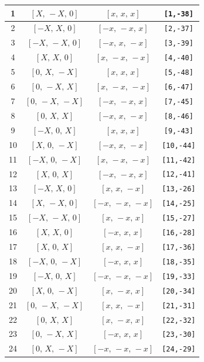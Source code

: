 \documentclass[fleqn,8pt]{jsarticle}
\begin{document}
\begin{longtable}{cccc}
1 & $\left[ X,\, - X,\, 0 \right]$ & $\left[ x,\, x,\, x \right]$ & {\tt [1,-38]} \\ \hline
2 & $\left[ - X,\, X,\, 0 \right]$ & $\left[ - x,\, - x,\, x \right]$ & {\tt [2,-37]} \\ \hline
3 & $\left[ - X,\, - X,\, 0 \right]$ & $\left[ - x,\, x,\, - x \right]$ & {\tt [3,-39]} \\ \hline
4 & $\left[ X,\, X,\, 0 \right]$ & $\left[ x,\, - x,\, - x \right]$ & {\tt [4,-40]} \\ \hline
5 & $\left[ 0,\, X,\, - X \right]$ & $\left[ x,\, x,\, x \right]$ & {\tt [5,-48]} \\ \hline
6 & $\left[ 0,\, - X,\, X \right]$ & $\left[ x,\, - x,\, - x \right]$ & {\tt [6,-47]} \\ \hline
7 & $\left[ 0,\, - X,\, - X \right]$ & $\left[ - x,\, - x,\, x \right]$ & {\tt [7,-45]} \\ \hline
8 & $\left[ 0,\, X,\, X \right]$ & $\left[ - x,\, x,\, - x \right]$ & {\tt [8,-46]} \\ \hline
9 & $\left[ - X,\, 0,\, X \right]$ & $\left[ x,\, x,\, x \right]$ & {\tt [9,-43]} \\ \hline
10 & $\left[ X,\, 0,\, - X \right]$ & $\left[ - x,\, x,\, - x \right]$ & {\tt [10,-44]} \\ \hline
11 & $\left[ - X,\, 0,\, - X \right]$ & $\left[ x,\, - x,\, - x \right]$ & {\tt [11,-42]} \\ \hline
12 & $\left[ X,\, 0,\, X \right]$ & $\left[ - x,\, - x,\, x \right]$ & {\tt [12,-41]} \\ \hline
13 & $\left[ - X,\, X,\, 0 \right]$ & $\left[ x,\, x,\, - x \right]$ & {\tt [13,-26]} \\ \hline
14 & $\left[ X,\, - X,\, 0 \right]$ & $\left[ - x,\, - x,\, - x \right]$ & {\tt [14,-25]} \\ \hline
15 & $\left[ - X,\, - X,\, 0 \right]$ & $\left[ x,\, - x,\, x \right]$ & {\tt [15,-27]} \\ \hline
16 & $\left[ X,\, X,\, 0 \right]$ & $\left[ - x,\, x,\, x \right]$ & {\tt [16,-28]} \\ \hline
17 & $\left[ X,\, 0,\, X \right]$ & $\left[ x,\, x,\, - x \right]$ & {\tt [17,-36]} \\ \hline
18 & $\left[ - X,\, 0,\, - X \right]$ & $\left[ - x,\, x,\, x \right]$ & {\tt [18,-35]} \\ \hline
19 & $\left[ - X,\, 0,\, X \right]$ & $\left[ - x,\, - x,\, - x \right]$ & {\tt [19,-33]} \\ \hline
20 & $\left[ X,\, 0,\, - X \right]$ & $\left[ x,\, - x,\, x \right]$ & {\tt [20,-34]} \\ \hline
21 & $\left[ 0,\, - X,\, - X \right]$ & $\left[ x,\, x,\, - x \right]$ & {\tt [21,-31]} \\ \hline
22 & $\left[ 0,\, X,\, X \right]$ & $\left[ x,\, - x,\, x \right]$ & {\tt [22,-32]} \\ \hline
23 & $\left[ 0,\, - X,\, X \right]$ & $\left[ - x,\, x,\, x \right]$ & {\tt [23,-30]} \\ \hline
24 & $\left[ 0,\, X,\, - X \right]$ & $\left[ - x,\, - x,\, - x \right]$ & {\tt [24,-29]} \\
\end{longtable}
\end{document}
